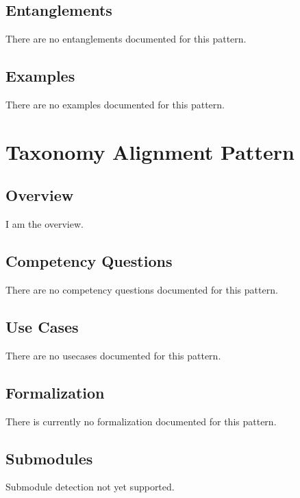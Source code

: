 \subsection{Entanglements}
\label{ssec:entanglements}
There are no entanglements documented for this pattern.

\subsection{Examples}
\label{ssec:examples}
There are no examples documented for this pattern.


\section{Taxonomy Alignment Pattern }
\label{sec:taxonomy-alignment-pattern-}
\subsection{Overview}
\label{ssec:overview}
I am the overview.

\subsection{Competency Questions}
\label{ssec:cqs}
There are no competency questions documented for this pattern.

\subsection{Use Cases}
\label{ssec:use-cases}
There are no usecases documented for this pattern.
\subsection{Formalization}
\label{ssec:formalization}
There is currently no formalization documented for this pattern.

\subsection{Submodules}
\label{ssec:submodules}
Submodule detection not yet supported.

